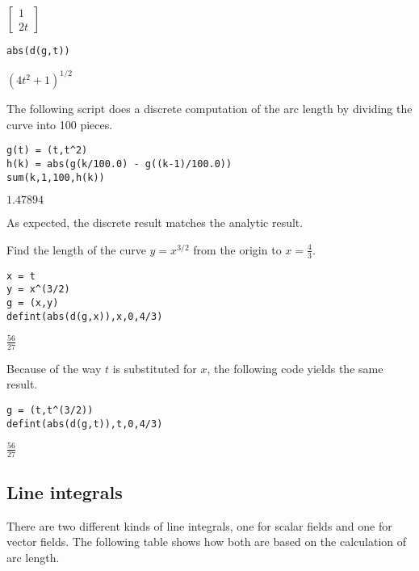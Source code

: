 \noindent
$\displaystyle \begin{bmatrix}1\\ 2t\end{bmatrix}$

\begin{Verbatim}[formatcom=\color{blue},samepage=true]
abs(d(g,t))
\end{Verbatim}

\noindent
$\displaystyle (4t^2+1)^{1/2}$

\bigskip
\noindent
The following script does a discrete computation of the arc length
by dividing the curve into 100 pieces.

\begin{Verbatim}[formatcom=\color{blue},samepage=true]
g(t) = (t,t^2)
h(k) = abs(g(k/100.0) - g((k-1)/100.0))
sum(k,1,100,h(k))
\end{Verbatim}

\noindent
$\displaystyle 1.47894$

\bigskip
\noindent
As expected, the discrete result matches the analytic result.

\bigskip
\noindent
Find the length of the curve $y=x^{3/2}$ from the origin to
$x=\tfrac{4}{3}$.

\begin{Verbatim}[formatcom=\color{blue},samepage=true]
x = t
y = x^(3/2)
g = (x,y)
defint(abs(d(g,x)),x,0,4/3)
\end{Verbatim}

\noindent
$\displaystyle \tfrac{56}{27}$

\bigskip
\noindent
Because of the way $t$ is substituted for $x$,
the following code yields the same result.

\begin{Verbatim}[formatcom=\color{blue},samepage=true]
g = (t,t^(3/2))
defint(abs(d(g,t)),t,0,4/3)
\end{Verbatim}

\noindent
$\displaystyle \tfrac{56}{27}$

\subsection{Line integrals}
There are two different kinds of line integrals,
one for scalar fields and one
for vector fields.
The following table shows how both are based on the calculation of
arc length.

